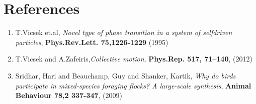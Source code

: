 \documentclass[12pt,a4paper]{article}
\begin{document}
\section*{References}
\begin{enumerate}
     \setlength{\itemsep}{0.1cm}
  	 \setlength{\parskip}{0cm}
  	 
    
     \item T.Vicsek et.al, \textit{Novel type of phase transition in a system of selfdriven particles},   \textbf{Phys.Rev.Lett. 75,1226-1229} (1995)
     \item T.Vicsek and A.Zafeiris,\textit{Collective motion}, \textbf{Phys.Rep. 517, 71–140}, (2012)
     	\item 	Sridhar, Hari and Beauchamp, Guy and Shanker, Kartik, \textit{Why do birds participate in mixed-species foraging flocks? A large-scale synthesis}, \textbf{Animal Behaviour 78,2 337-347}, (2009)
    \end{enumerate}
\end{document}
